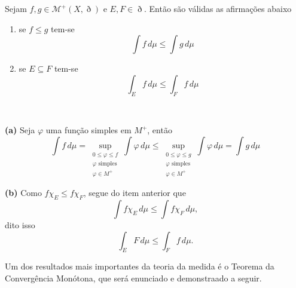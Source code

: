 \documentclass[a4paper, 11pt]{book}
\theoremstyle{definition}
\newcommand{\cM}{\mathcal{M}}
\begin{document}
\begin{lbox} \label{lm:propriedades-integral-nao-negativa}
    Sejam $f, g \in \cM^+(X,\eth)$ e $E, F \in \eth$.
    Então são válidas as afirmações abaixo
    \begin{enumerate}[leftmargin=*, label=\textbf{(\alph*)}]
        \item se $f \leqslant g$ tem-se
        \[
            \int f \, d\mu \leqslant \int g \, d\mu
        \]
        \item se $E \subseteq F$ tem-se
        \[
            \int_E f \, d\mu \leqslant \int_F f \, d\mu
        \]
    \end{enumerate}
\end{lbox}
\begin{prf}
    ~

    \textbf{(a)} Seja $\varphi$ uma função simples em $M^+$, então
    \[
        \int f \, d\mu = \sup_{\substack{0 \leqslant \varphi \leqslant f \\ \varphi \text{ simples} \\ \varphi \in M^+}} \int \varphi \, d \mu \leqslant \sup_{\substack{0 \leqslant \varphi \leqslant g \\ \varphi \text{ simples} \\ \varphi \in M^+}} \int \varphi \, d \mu = \int g \, d\mu
    \]

    \textbf{(b)} Como $f \chi_E \leqslant f \chi_F$, segue do item anterior que
    \[
        \int f \chi_E \, d\mu \leqslant \int f \chi_F \, d\mu,
    \]
    dito isso
    \[
        \int_E F \, d \mu \leqslant \int_F f \, d\mu.
    \]
\end{prf}

Um dos resultados mais importantes da teoria da medida é o Teorema da Convergência Monótona, que será enunciado e demonstraado a seguir.
\end{document}
